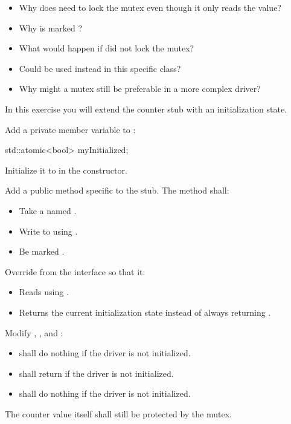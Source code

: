 \begin{itemize}
  \item Why does  need to lock the mutex even though it only reads the value?
  \item Why is  marked ?
  \item What would happen if  did not lock the mutex?
  \item Could  be used instead in this specific class?
  \item Why might a mutex still be preferable in a more complex driver?
\end{itemize}

\label{c6:set:5}

\label{c6:ex:5.1}
In this exercise you will extend the counter stub with an initialization state.

Add a private member variable to :

\begin{cppcode}
std::atomic<bool> myInitialized;
\end{cppcode}

\noindent Initialize it to  in the constructor.

\label{c6:ex:5.2}
Add a public method  specific to the stub. The method shall:
\begin{itemize}
  \item Take a  named .
  \item Write to  using .
  \item Be marked .
\end{itemize}
Override  from the interface so that it:
\begin{itemize}
  \item Reads  using .
  \item Returns the current initialization state instead of always returning .
\end{itemize}

\label{c6:ex:5.3}
Modify , , and :
\begin{itemize}
  \item {} shall do nothing if the driver is not initialized.
  \item {} shall return  if the driver is not initialized.
  \item {} shall do nothing if the driver is not initialized.
\end{itemize}
The counter value itself shall still be protected by the mutex.

